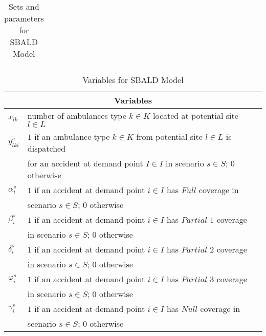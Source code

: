 \begin{table}[h]
\begin{tabular}{ll}
\end{tabular}
\caption{Sets and parameters for SBALD Model }
\label{tab:table1}
\end{table}




\begin{table}[h]
\centering
\begin{tabular}{ll}
\hline
\multicolumn{2}{c}{Variables}                                                                                   \\ \hline
$x_{lk}$      & number of ambulances type $k \in K$ located at potential site $l \in L$                         \\
$y_{lki}^s$   & $1$ if an ambulance type $k \in K$ from potential site $l \in L$ is dispatched                  \\
              & for an accident at demand point $I \in I$ in scenario $s \in S$; $0$ otherwise                  \\
$\alpha_i^s$  & $1$ if an accident at demand point $i \in I$ has $Full$ coverage in         \\
              & scenario $ s \in S$; $0$ otherwise                                                                                   \\
$\beta_i^s$   & $1$ if an accident at demand point $i \in I$ has $Partial$ $1$ coverage  \\
              & in scenario $ s \in S$; $0$ otherwise                                                                                   \\
$\delta_i^s$  & $1$ if an accident at demand point $i \in I$ has $Partial$ $2$ coverage  \\
              & in scenario $ s \in S$; $0$ otherwise                                                                                   \\
$\varphi_i^s$ & $1$ if an accident at demand point $i \in I$ has $Partial$ $3$ coverage  \\
              & in scenario $ s \in S$; $0$ otherwise                                                                                   \\
$\gamma_i^s$  & $1$ if an accident at demand point $i \in I$ has $Null$ coverage in         \\
              & scenario $ s \in S$; $0$ otherwise      \\ \hline                                                                            
\end{tabular}
\caption{Variables for SBALD Model}
\label{tab:table2}
\end{table}


